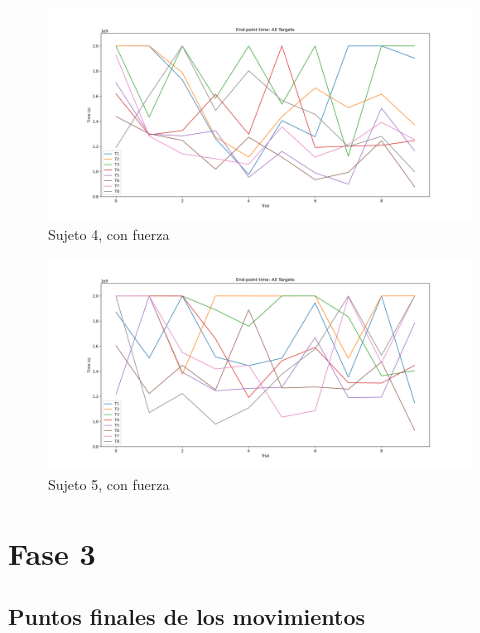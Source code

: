 \documentclass[a4paper,11pt, oneside]{book}
\begin{document}
\begin{figure}[H]
	\includegraphics[width=\linewidth]{sujeto4/force/evolution_time}
	\caption{Sujeto 4, con fuerza}
	\label{4-2-3}
\end{figure}
\begin{figure}[H]
	\includegraphics[width=\linewidth]{sujeto5/force/evolution_time}
	\caption{Sujeto 5, con fuerza}
	\label{5-2-3}
\end{figure}



\chapter{Fase 3}

\section{Puntos finales de los movimientos}
\label{anexo:5}
\end{document}

